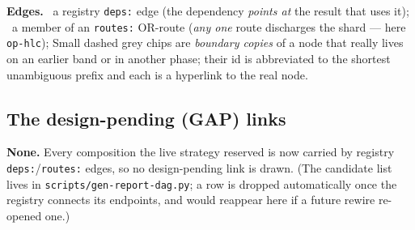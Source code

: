 \noindent\textbf{Edges.}\quad
{}~a registry \texttt{deps:} edge (the dependency \emph{points at} the result that uses it);\quad
{}~a member of an \texttt{routes:} OR-route (\emph{any one} route discharges the shard --- here \texttt{op-hlc});\quad
Small dashed grey chips are \emph{boundary copies} of a node that really lives on an earlier band or in another phase; their id is abbreviated to the shortest unambiguous prefix and each is a hyperlink to the real node.

\subsection*{The design-pending (GAP) links}

\noindent \textbf{None.} Every composition the live strategy reserved is now carried by registry \texttt{deps:}/\texttt{routes:} edges, so no design-pending link is drawn. (The candidate list lives in \texttt{scripts/gen-report-dag.py}; a row is dropped automatically once the registry connects its endpoints, and would reappear here if a future rewire re-opened one.)

